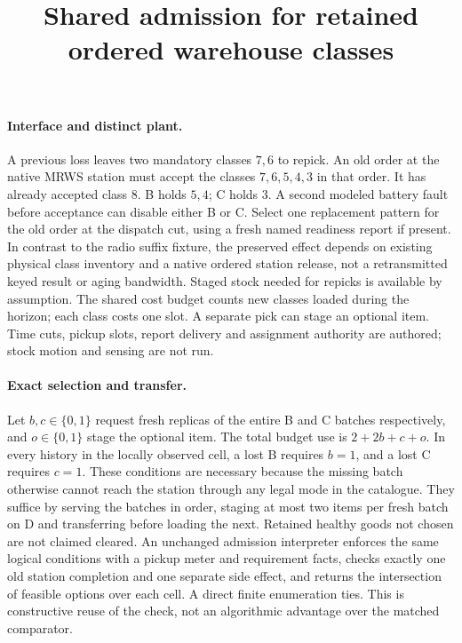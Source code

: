 \documentclass{article}
\title{Shared admission for retained ordered warehouse classes}
\begin{document}
\maketitle
\paragraph{Interface and distinct plant.}
A previous loss leaves two mandatory classes \(7,6\) to repick. An old order at the native MRWS station must accept the classes \(7,6,5,4,3\) in that order. It has already accepted class \(8\). B holds \(5,4\); C holds \(3\). A second modeled battery fault before acceptance can disable either B or C. Select one replacement pattern for the old order at the dispatch cut, using a fresh named readiness report if present. In contrast to the radio suffix fixture, the preserved effect depends on existing physical class inventory and a native ordered station release, not a retransmitted keyed result or aging bandwidth. Staged stock needed for repicks is available by assumption. The shared cost budget counts new classes loaded during the horizon; each class costs one slot. A separate pick can stage an optional item. Time cuts, pickup slots, report delivery and assignment authority are authored; stock motion and sensing are not run.

\paragraph{Exact selection and transfer.}
Let \(b,c\in\{0,1\}\) request fresh replicas of the entire B and C batches respectively, and \(o\in\{0,1\}\) stage the optional item. The total budget use is \(2+2b+c+o\). In every history in the locally observed cell, a lost B requires \(b=1\), and a lost C requires \(c=1\). These conditions are necessary because the missing batch otherwise cannot reach the station through any legal mode in the catalogue. They suffice by serving the batches in order, staging at most two items per fresh batch on D and transferring before loading the next. Retained healthy goods not chosen are not claimed cleared. An unchanged admission interpreter enforces the same logical conditions with a pickup meter and requirement facts, checks exactly one old station completion and one separate side effect, and returns the intersection of feasible options over each cell. A direct finite enumeration ties. This is constructive reuse of the check, not an algorithmic advantage over the matched comparator.
\end{document}

